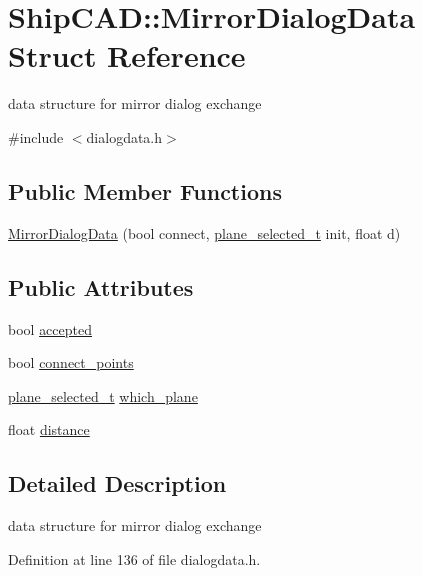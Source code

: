 \hypertarget{structShipCAD_1_1MirrorDialogData}{}\section{Ship\+C\+AD\+:\+:Mirror\+Dialog\+Data Struct Reference}
\label{structShipCAD_1_1MirrorDialogData}


data structure for mirror dialog exchange  




{\ttfamily \#include $<$dialogdata.\+h$>$}

\subsection*{Public Member Functions}
\begin{DoxyCompactItemize}
\item 
\hyperlink{structShipCAD_1_1MirrorDialogData_acda8c01f77958f1f073d496f07cd9af6}{Mirror\+Dialog\+Data} (bool connect, \hyperlink{namespaceShipCAD_aa0f3f220e102a298d2e698af90f5e1fc}{plane\+\_\+selected\+\_\+t} init, float d)
\end{DoxyCompactItemize}
\subsection*{Public Attributes}
\begin{DoxyCompactItemize}
\item 
bool \hyperlink{structShipCAD_1_1MirrorDialogData_afcb200cc96d661381d54e6ca4919a216}{accepted}
\item 
bool \hyperlink{structShipCAD_1_1MirrorDialogData_a6e3cdbe59eeedec71b5d3b56e5414516}{connect\+\_\+points}
\item 
\hyperlink{namespaceShipCAD_aa0f3f220e102a298d2e698af90f5e1fc}{plane\+\_\+selected\+\_\+t} \hyperlink{structShipCAD_1_1MirrorDialogData_a4e17198aa242bba6426a2b28840ceca5}{which\+\_\+plane}
\item 
float \hyperlink{structShipCAD_1_1MirrorDialogData_ab692a899cc809b67fd65fee10848e863}{distance}
\end{DoxyCompactItemize}


\subsection{Detailed Description}
data structure for mirror dialog exchange 

Definition at line 136 of file dialogdata.\+h.



